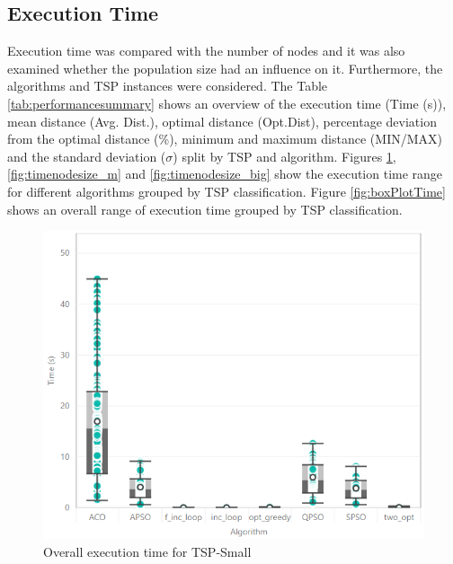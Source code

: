 \documentclass[conference]{IEEEtran}
\begin{document}
    \subsection{Execution Time}
    Execution time was compared with the number of nodes and it was also examined whether the population size had an influence on it. Furthermore, the algorithms and TSP instances were considered. The Table \ref{tab:performancesummary} shows an overview of the execution time (Time (s)), mean distance (Avg. Dist.), optimal distance (Opt.Dist), percentage deviation from the optimal distance (\%), minimum and maximum distance (MIN/MAX) and the standard deviation ($\sigma$) split by TSP and algorithm.
   Figures \ref{fig:timenodesize_small}, \ref{fig:timenodesize_m} and \ref{fig:timenodesize_big} show the execution time range for different algorithms grouped by TSP classification. Figure \ref{fig:boxPlotTime} shows an overall range of execution time grouped by TSP classification.
   \begin{figure}[H]
    		\centering
    		\includegraphics[width=\columnwidth]{boxplot_time_S.png}
    		\caption{Overall execution time for TSP-Small}
    		\label{fig:timenodesize_small}
	 \end{figure}
\end{document}
